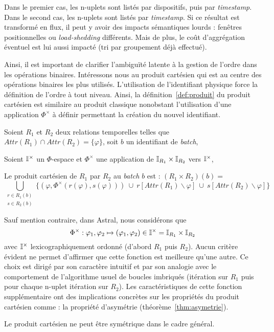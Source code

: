 \begin{example}
Dans le premier cas, les n-uplets sont listés par dispositifs, puis par \textit{timestamp}. Dans le second cas, les n-uplets sont listés par \textit{timestamp}. Si ce résultat est transformé en flux, il peut y avoir des impacts sémantiques lourds : fenêtres positionnelles ou \textit{load-shedding} différents. Mais de plus, le coût d'aggrégation éventuel est lui aussi impacté (tri par groupement déjà effectué).
\end{example}

Ainsi, il est important de clarifier l'ambiguïté latente à la gestion de l'ordre dans les opérations binaires. Intéressons nous au produit cartésien qui est au centre des opérations binaires les plus utilisés. L'utilisation de l'identifiant physique force la définition de l'ordre à tout niveau. Ainsi, la définition~\ref{def:produit} du produit cartésien est similaire au produit classique nonobstant l'utilisation d'une application $\Phi^\times$ à définir permettant la création du nouvel identifiant.
\begin{defi}\label{def:produit}
Soient $R_1$ et $R_2$ deux relations temporelles telles que $Attr(R_1) \cap Attr(R_2) = \{\varphi\}$, soit $b$ un identifiant de \textit{batch},

Soient $\mathbb{I}^{\times}$ un $\Phi$-espace et $\Phi^\times$ une application de $\mathbb{I}_{R_1}\times\mathbb{I}_{R_2}$ vers $\mathbb{I}^\times$,

Le produit cartésien de $R_1$ par $R_2$ au \textit{batch} $b$ est : $(R_1\times R_2)(b)=$
$$\bigcup_{\begin{array}{c}  r \in R_1(b)\\ s \in R_2(b)\end{array}} \{(\varphi, \Phi^\times(r(\varphi), s(\varphi))) \ \cup \ r[Attr(R_1)\backslash \varphi]\ \cup\ s[Attr(R_2)\backslash \varphi]\}$$
\end{defi}

Sauf mention contraire, dans Astral, nous considérons que $$\Phi^\times : \varphi_1, \varphi_2 \mapsto (\varphi_1,\varphi_2)\in \mathbb{I}^\times=\mathbb{I}_{R_1}\times \mathbb{I}_{R_2}$$ avec $\mathbb{I}^\times$ lexicographiquement ordonné (d'abord $R_1$ puis $R_2$). Aucun critère évident ne permet d'affirmer que cette fonction est meilleure qu'une autre. Ce choix est dirigé par son caractère intuitif et par son analogie avec le comportement de l'algorithme usuel de boucles imbriqués (itération sur $R_1$ puis pour chaque n-uplet itération sur $R_2$). Les caractéristiques de cette fonction supplémentaire ont des implications concrètes sur les propriétés du produit cartésien comme : la propriété d'asymétrie (théorème~\ref{thm:asymetrie}). 
\begin{thm}\label{thm:asymetrie}
    Le produit cartésien ne peut être symétrique dans le cadre général.
\end{thm}

